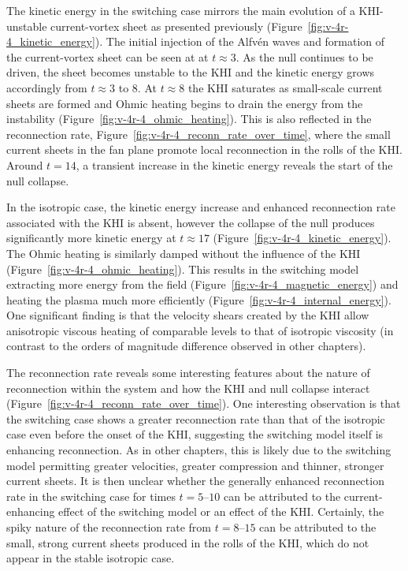 
The kinetic energy in the switching case mirrors the main evolution of a KHI-unstable current-vortex sheet as presented previously (Figure~\ref{fig:v-4r-4_kinetic_energy}). The initial injection of the Alfv\'en waves and formation of the current-vortex sheet can be seen at at $t\approx3$. As the null continues to be driven, the sheet becomes unstable to the KHI and the kinetic energy grows accordingly from $t\approx3$ to $8$. At $t\approx 8$ the KHI saturates as small-scale current sheets are formed and Ohmic heating begins to drain the energy from the instability (Figure~\ref{fig:v-4r-4_ohmic_heating}). This is also reflected in the reconnection rate, Figure~\ref{fig:v-4r-4_reconn_rate_over_time}, where the small current sheets in the fan plane promote local reconnection in the rolls of the KHI. Around $t=14$, a transient increase in the kinetic energy reveals the start of the null collapse. 

In the isotropic case, the kinetic energy increase and enhanced reconnection rate associated with the KHI is absent, however the collapse of the null produces significantly more kinetic energy at $t\approx 17$ (Figure~\ref{fig:v-4r-4_kinetic_energy}). The Ohmic heating is similarly damped without the influence of the KHI (Figure~\ref{fig:v-4r-4_ohmic_heating}). This results in the switching model extracting more energy from the field (Figure~\ref{fig:v-4r-4_magnetic_energy}) and heating the plasma much more efficiently (Figure~\ref{fig:v-4r-4_internal_energy}). One significant finding is that the velocity shears created by the KHI allow anisotropic viscous heating of comparable levels to that of isotropic viscosity (in contrast to the orders of magnitude difference observed in other chapters). 

The reconnection rate reveals some interesting features about the nature of reconnection within the system and how the KHI and null collapse interact (Figure~\ref{fig:v-4r-4_reconn_rate_over_time}). One interesting observation is that the switching case shows a greater reconnection rate than that of the isotropic case even before the onset of the KHI, suggesting the switching model itself is enhancing reconnection. As in other chapters, this is likely due to the switching model permitting greater velocities, greater compression and thinner, stronger current sheets. It is then unclear whether the generally enhanced reconnection rate in the switching case for times $t=5$--$10$ can be attributed to the current-enhancing effect of the switching model or an effect of the KHI. Certainly, the spiky nature of the reconnection rate from $t=8$--$15$ can be attributed to the small, strong current sheets produced in the rolls of the KHI, which do not appear in the stable isotropic case.

